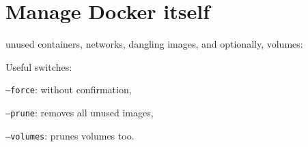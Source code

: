 
\section{Manage Docker itself}
 unused containers, networks, dangling images, and optionally, volumes:

Useful switches:
\begin{compactitem}
	\item \texttt{--force}: without confirmation,
	\item \texttt{--prune}: removes all unused images,
    \item \texttt{--volumes}: prunes volumes too.
\end{compactitem}

